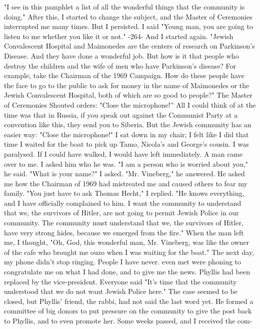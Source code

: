 "I see in this 
pamphlet a list of all the wonderful things that the community is 
doing."
After this, I started to change the subject, and the Master 
of Ceremonies interrupted me many times.
But I persisted.
I said 
"Young man, you are going to listen to me whether you like it or not."
-264- 
And I started again.
"Jewish Convalescent Hospital and Maimonedes are the centers 
of research on Parkinson's Disease.
And they have done a wonderful job.
But how is it that people who destroy the children and the wife 
of men who have Parkinson's disease?
For example, take the Chairman 
of the 1969 Campaign.
How do these people have the face to go to the 
public to ask for money in the name of Maimonedes or the Jewish Convalescent Hospital, both of which are so good to people?"
The Master of Ceremonies Shouted orders: "Close the microphone!” 
All I could think of at the time was that in Russia, if you speak 
out against the Communist Party at a convention like this,
they send you to Siberia.
But the Jewish community has an easier way: 
"Close the microphone!"
I sat down in my chair; I felt like I did that 
time I waited for the boat to pick up Tamo, Nicola's and George's 
cousin.
I was paralysed.
If I could have walked, I would have left 
immediately.
A man came over to me.
I asked him who he was.
"I am a person who is worried about you," he said.
"What is your name?"
I asked.
"Mr.
Vineberg," he answered.
He asked me how the Chairman of 
1969 had mistreated me and caused others to fear my family.
"You just have to ask Thomas Hecht," I replied.
"He knows
everything, and I have officially complained to him.
I want the 
community to understand that we, the survivors of Hitler, are not going to permit Jewish Police in our community.
The community must 
understand that we, the survivors of Hitler, have very strong hides, 
because we emerged from the fire."
When the man left me, I thought, "Oh, God, this wonderful man, 
Mr.
Vineberg, was like the owner of the cafe who brought me ouzo when 
I was waiting for the boat."
The next day, my phone didn't stop ringing.
People I have never.
even met were phoning to congratulate me on what I had done, and to 
give me the news.
Phyllis had been replaced by the vice-president.
Everyone said "It's time that the community understood that we do 
not want Jewish Police here."
The case seemed to be closed, but Phyllis' friend, the rabbi, 
had not said the last word yet.
He formed a committee of big donors 
to put pressure on the community to give the post back to Phyllis, 
and to even promote her.
Some weeks passed, and I received the com-
